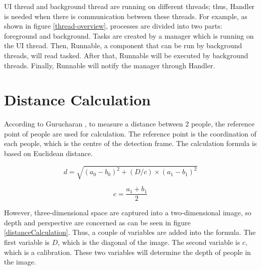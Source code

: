         UI thread and background thread are running on different threads;
        thus, Handler is needed when there is communication between these threads.
        For example, as shown in figure \ref{thread-overview},
        processes are divided into two parts: foreground and background.
        Tasks are created by a manager which is running on the UI thread.
        Then, Runnable, a component that can be run by background threads, will read tasked.
        After that, Runnable will be executed by background threads.
        Finally, Runnable will notify the manager through Handler.

    \section{Distance Calculation}\label{sectionDistanceCalculation}
        According to Gurucharan \cite{SOCIAL-DISTANCING-DETECTION}, to measure a distance between 2 people, the reference point of people are used for calculation.
        The reference point is the coordination of each people, which is the centre of the detection frame.
        The calculation formula is based on Euclidean distance.

        \begin{equation*}
            d = \sqrt{(a_{0}-b_{0})^{2}+(D/c)\times(a_{1}-b_{1})^{2}}
        \end{equation*}

        \begin{equation*}
            c = \frac{a_{1}+b_{1}}{2}
        \end{equation*}

        However, three-dimensional space are captured into a two-dimensional image,
        so depth and perspective are concerned as can be seen in figure \ref{distanceCalculation}.
        Thus, a couple of variables are added into the formula.
        The first variable is $D$, which is the diagonal of the image.
        The second variable is $c$, which is a calibration.
        These two variables will determine the depth of people in the image.

